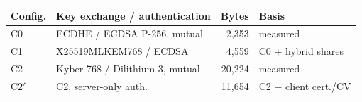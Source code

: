 \begin{tabular}{@{}llrl@{}}\toprule
Config. & Key exchange / authentication & Bytes & Basis \\ \midrule
C0 & ECDHE / ECDSA P-256, mutual & 2,353 & measured~\cite{tasopoulos2022} \\
C1 & X25519MLKEM768 / ECDSA & 4,559 & C0 + hybrid shares~\cite{rfc10024} \\
C2 & Kyber-768 / Dilithium-3, mutual & 20,224 & measured~\cite{tasopoulos2022} \\
C2$'$ & C2, server-only auth. & 11,654 & C2 $-$ client cert./CV \\
\bottomrule\end{tabular}
